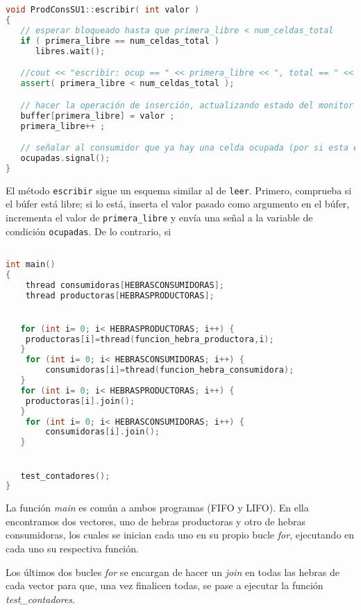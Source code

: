 \documentclass{article}
\begin{document}
\newpage
\begin{lstlisting}[language=C++,caption=función escribir monitor  LIFO ] 


void ProdConsSU1::escribir( int valor )
{
   // esperar bloqueado hasta que primera_libre < num_celdas_total
   if ( primera_libre == num_celdas_total )
      libres.wait();

   //cout << "escribir: ocup == " << primera_libre << ", total == " << num_celdas_total << endl ;
   assert( primera_libre < num_celdas_total );

   // hacer la operación de inserción, actualizando estado del monitor
   buffer[primera_libre] = valor ;
   primera_libre++ ;

   // señalar al consumidor que ya hay una celda ocupada (por si esta esperando)
   ocupadas.signal();
}
\end{lstlisting}
El método \texttt{escribir} sigue un esquema similar al de \texttt{leer}. Primero, comprueba si el búfer está libre; si lo está, inserta el valor pasado como argumento en el búfer, incrementa el valor de \texttt{primera\_libre} y envía una señal a la variable de condición \texttt{ocupadas}. De lo contrario, si 

\begin{lstlisting}[language=C++,caption=función main multiproductor consumidor  (FIFO y LIFO) ] 

int main()
{
	thread consumidoras[HEBRASCONSUMIDORAS];
	thread productoras[HEBRASPRODUCTORAS];


   for (int i= 0; i< HEBRASPRODUCTORAS; i++) {
	productoras[i]=thread(funcion_hebra_productora,i);
   } 
	for (int i= 0; i< HEBRASCONSUMIDORAS; i++) {
		consumidoras[i]=thread(funcion_hebra_consumidora);
   }
   for (int i= 0; i< HEBRASPRODUCTORAS; i++) {
	productoras[i].join();
   } 
	for (int i= 0; i< HEBRASCONSUMIDORAS; i++) {
		consumidoras[i].join();
   }


   test_contadores();
}
\end{lstlisting}

La función \textit{main} es común a ambos programas (FIFO y LIFO). En ella encontramos dos vectores, uno de hebras productoras y otro de hebras consumidoras, los cuales se inician cada uno en su propio bucle \textit{for}, ejecutando en cada uno su respectiva función. 

Los últimos dos bucles \textit{for} se encargan de hacer un \textit{join} en todas las hebras de cada vector para que, una vez finalicen todas, se pase a ejecutar la función \textit{test\_contadores}.
\end{document}
